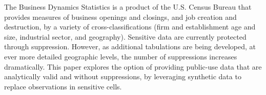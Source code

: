 The Business Dynamics Statistics is a product of the U.S. Census Bureau that provides measures of business openings and closings,  and job creation and destruction, by a variety of cross-classifications (firm and establishment age and size, industrial sector, and geography). Sensitive data are currently protected through suppression. However, as additional tabulations are being developed, at ever more detailed geographic levels, the number of suppressions increases dramatically. This paper explores the option of providing public-use data that are analytically valid and without suppressions, by leveraging synthetic data to replace observations in sensitive cells. 